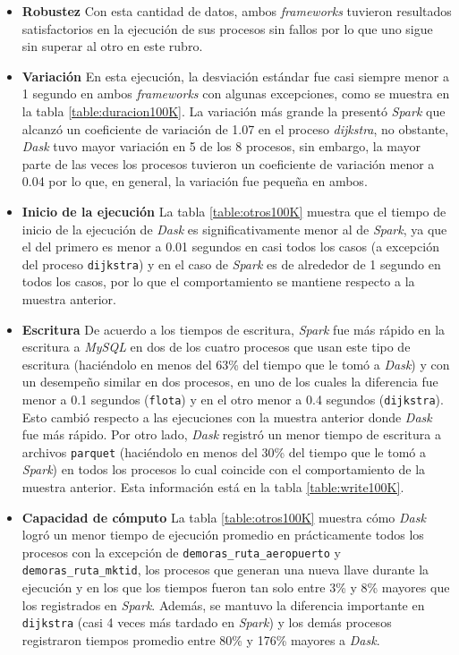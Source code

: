 \begin{itemize}
	\item \textbf{Robustez} Con esta cantidad de datos, ambos \textit{frameworks} tuvieron resultados satisfactorios en la ejecución de sus procesos sin fallos por lo que uno sigue sin superar al otro en este rubro.
	
	\item \textbf{Variación} En esta ejecución, la desviación estándar fue casi siempre menor a 1 segundo en ambos \textit{frameworks} con algunas excepciones, como se muestra en la tabla \ref{table:duracion100K}. La variación más grande la presentó \textit{Spark} que alcanzó un coeficiente de variación de 1.07 en el proceso \textit{dijkstra}, no obstante, \textit{Dask} tuvo mayor variación en 5 de los 8 procesos, sin embargo, la mayor parte de las veces los procesos tuvieron un coeficiente de variación menor a 0.04 por lo que, en general, la variación fue pequeña en ambos.
	
	\item \textbf{Inicio de la ejecución} La tabla \ref{table:otros100K} muestra que el tiempo de inicio de la ejecución de \textit{Dask} es significativamente menor al de \textit{Spark}, ya que el del primero es menor a 0.01 segundos en casi todos los casos (a excepción del proceso \texttt{dijkstra}) y en el caso de \textit{Spark} es de alrededor de 1 segundo en todos los casos, por lo que el comportamiento se mantiene respecto a la muestra anterior.
	
	\item \textbf{Escritura} De acuerdo a los tiempos de escritura, \textit{Spark} fue más rápido en la escritura a \textit{MySQL} en dos de los cuatro procesos que usan este tipo de escritura (haciéndolo en menos del 63\% del tiempo que le tomó a \textit{Dask}) y con un desempeño similar en dos procesos, en uno de los cuales la diferencia fue menor a 0.1 segundos (\texttt{flota}) y en el otro menor a 0.4 segundos (\texttt{dijkstra}). Esto cambió respecto a las ejecuciones con la muestra anterior donde \textit{Dask} fue más rápido. Por otro lado, \textit{Dask} registró un menor tiempo de escritura a archivos \texttt{parquet} (haciéndolo en menos del 30\% del tiempo que le tomó a \textit{Spark}) en todos los procesos lo cual coincide con el comportamiento de la muestra anterior. Esta información está en la tabla \ref{table:write100K}.
	
	\item \textbf{Capacidad de cómputo} La tabla \ref{table:otros100K} muestra cómo \textit{Dask} logró un menor tiempo de ejecución promedio en prácticamente todos los procesos con la excepción de \texttt{demoras\_ruta\_aeropuerto} y \texttt{demoras\_ruta\_mktid}, los procesos que generan una nueva llave durante la ejecución y en los que los tiempos fueron tan solo entre 3\% y 8\% mayores que los registrados en \textit{Spark}. Además, se mantuvo la diferencia importante en \texttt{dijkstra} (casi 4 veces más tardado en \textit{Spark}) y los demás procesos registraron tiempos promedio entre 80\% y 176\% mayores a \textit{Dask}.
	

\end{itemize}
